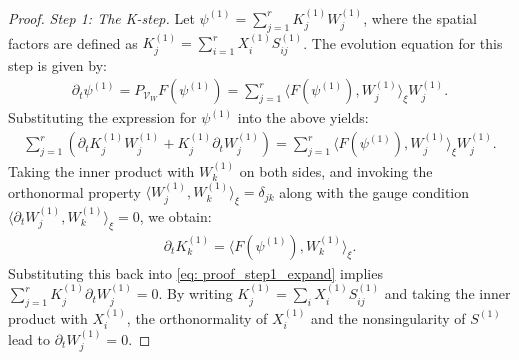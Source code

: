 \documentclass[preprint,11pt]{elsarticle}
\begin{document}
\begin{proof}
    \textit{Step 1: The K-step.} 
    Let $\psi^{(1)} = \sum_{j=1}^r K_j^{(1)} W_j^{(1)}$, where the spatial factors are defined as $K_j^{(1)} = \sum_{i=1}^r X_i^{(1)} S_{ij}^{(1)}$. The evolution equation for this step is given by:
    \begin{align*}
        \partial_t \psi^{(1)} = P_{\mathcal{V}_W} F(\psi^{(1)}) = \sum_{j=1}^r \langle F(\psi^{(1)}), W_j^{(1)} \rangle_{\xi} W_j^{(1)}.
    \end{align*} 
    Substituting the expression for $\psi^{(1)}$ into the above yields:
    \begin{align}\label{eq: proof_step1_expand}
        \sum_{j=1}^r \left( \partial_t K_j^{(1)} W_j^{(1)} + K_j^{(1)} \partial_t W_j^{(1)} \right) = \sum_{j=1}^r \langle F(\psi^{(1)}), W_j^{(1)} \rangle_{\xi} W_j^{(1)}.
    \end{align}
    Taking the inner product with $W_k^{(1)}$ on both sides, and invoking the orthonormal property $\langle W_j^{(1)}, W_k^{(1)} \rangle_{\xi} = \delta_{jk}$ along with the gauge condition $\langle \partial_t W_j^{(1)}, W_k^{(1)} \rangle_{\xi} = 0$, we obtain:
    \begin{align*}
        \partial_t K_k^{(1)} = \langle F(\psi^{(1)}), W_k^{(1)} \rangle_{\xi}.
    \end{align*}
    Substituting this back into \eqref{eq: proof_step1_expand} implies $\sum_{j=1}^r K_j^{(1)} \partial_t W_j^{(1)} = 0$. By writing $K_j^{(1)} = \sum_i X_i^{(1)} S_{ij}^{(1)}$ and taking the inner product with $X_i^{(1)}$, the orthonormality of $X_i^{(1)}$ and the nonsingularity of $S^{(1)}$ lead to $\partial_t W_j^{(1)} = 0$.


\end{proof}
\end{document}
